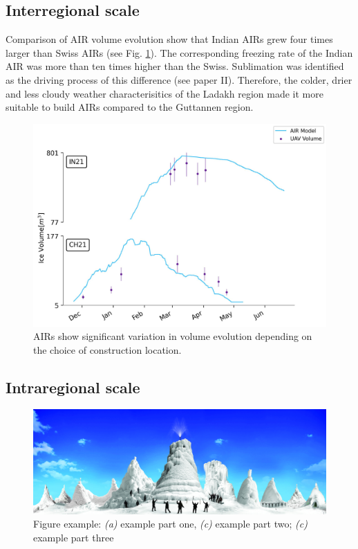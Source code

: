 \subsection{Interregional scale}

Comparison of AIR volume evolution show that Indian AIRs grew four times larger than Swiss AIRs (see Fig.
\ref{fig:2AIRs}). The corresponding freezing rate of the Indian AIR was more than ten times higher than the
Swiss. Sublimation was identified as the driving process of this difference (see paper II). Therefore, the
colder, drier and less cloudy weather characterisitics of the Ladakh region made it more suitable to build AIRs
compared to the Guttannen region.

\begin{figure}[htb]
\centering
\includegraphics[width=12cm]{figs/IN21vsCH21.jpg}
\caption{AIRs show significant variation in volume evolution depending on the choice of construction location.}
\label{fig:2AIRs}
\end{figure}

\subsection{Intraregional scale}

\begin{figure}[htb]
	\includegraphics[width=\textwidth]{figs/AIRs_Ladakh}
	\caption{Figure example: \textit{(a)} example part one, \textit{(c)} example part two; \textit{(c)} example part three}
	\label{fig:airs_ladakh}
\end{figure}

